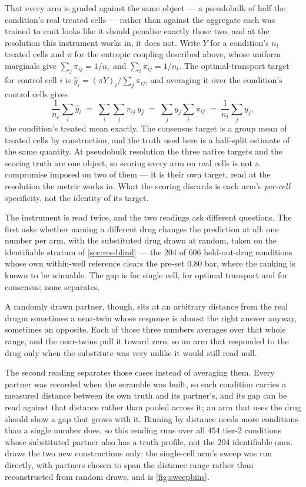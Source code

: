 That every arm is graded against the same object — a pseudobulk of half the condition's real treated cells — rather than against the aggregate each was trained to emit looks like it should penalise exactly those two, and at the resolution this instrument works in, it does not. Write $Y$ for a condition's $n_t$ treated cells and $\pi$ for
the entropic coupling described above, whose uniform marginals give
$\sum_j \pi_{ij} = 1/n_c$ and $\sum_i \pi_{ij} = 1/n_t$. The optimal-transport
target for control cell $i$ is $\hat{y}_i = (\pi Y)_i \big/ \sum_j \pi_{ij}$, and
averaging it over the condition's control cells gives
\begin{equation}
 \frac{1}{n_c}\sum_{i} \hat{y}_i
 \;=\; \sum_{i}\sum_{j} \pi_{ij}\, y_j
 \;=\; \sum_{j} y_j \sum_{i} \pi_{ij}
 \;=\; \frac{1}{n_t}\sum_{j} y_j ,
\end{equation}
the condition's treated mean exactly. The consensus target is a group mean of
treated cells by construction, and the truth used here is a half-split estimate
of the same quantity. At pseudobulk resolution the three native targets and the
scoring truth are one object, so scoring every arm on real cells is not a
compromise imposed on two of them --- it is their own target, read at the
resolution the metric works in. What the scoring discards is each arm's
\emph{per-cell} specificity, not the identity of its target.

The instrument is read twice, and the two readings ask different questions. The
first asks whether naming a different drug changes the prediction at all: one
number per arm, with the substituted drug drawn at random, taken on the
identifiable stratum of \cref{sec:res-blind} --- the $\num{204}$ of $\num{606}$
held-out-drug conditions whose own within-well reference clears the pre-set
$0.80$ bar, where the ranking is known to be winnable. The gap is
 for single cell,  for
optimal transport and  for consensus; none separates.

A randomly drawn partner, though, sits at an arbitrary distance from the real
drugm sometimes a near-twin whose response is almost the right answer anyway,
sometimes an opposite. Each of those three numbers averages over that whole
range, and the near-twins pull it toward zero, so an arm that responded to the
drug only when the substitute was very unlike it would still read null.

The second reading separates those cases instead of averaging them. Every partner
was recorded when the scramble was built, so each condition carries a measured
distance between its own truth and its partner's, and its gap can be read against
that distance rather than pooled across it; an arm that uses the drug should show
a gap that grows with it. Binning by distance needs more conditions than a single
number does, so this reading runs over all $\num{454}$ tier-2 conditions whose
substituted partner also has a truth profile, not the $\num{204}$ identifiable
ones.  draws the two new constructions only: the single-cell
arm's sweep was run directly, with partners chosen to span the distance range
rather than reconstructed from random draws, and is \cref{fig:sweepbins}.

